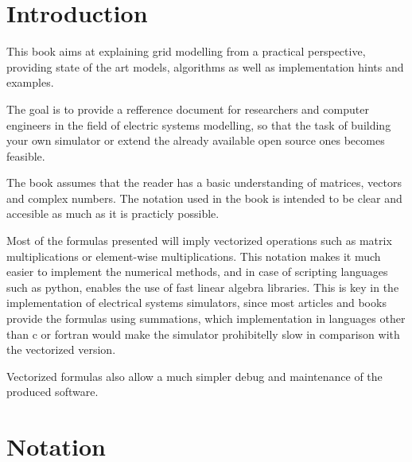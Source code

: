 \documentclass{tufte-book}
\begin{document}
\tableofcontents

\listoffigures

\listoftables


\chapter{Introduction}

This book aims at explaining grid modelling from a practical perspective, providing state of the art models, algorithms as well as implementation hints and examples.

The goal is to provide a refference document for researchers and computer engineers in the field of electric systems modelling, so that the task of building your own simulator or extend the already available open source ones becomes feasible.

The book assumes that the reader has a basic understanding of matrices, vectors and complex numbers. The notation used in the book is intended to be clear and accesible as much as it is practicly possible.

Most of the formulas presented will imply vectorized operations such as matrix multiplications or element-wise multiplications. This notation makes it much easier to implement the numerical methods, and in case of scripting languages such as python, enables the use of fast linear algebra libraries. This is key in the implementation of electrical systems simulators, since most articles and books provide the formulas using summations, which implementation in languages other than c or fortran would make the simulator prohibitelly slow in comparison with the vectorized version.

Vectorized formulas also allow a much simpler debug and maintenance of the produced software.


\chapter{Notation}
\end{document}
